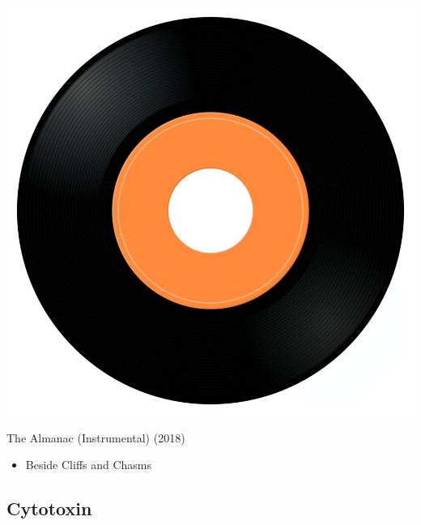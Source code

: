\begin{minipage}[t]{0.25\textwidth}\vspace{0pt}
\captionsetup{type=figure}
\includegraphics[width=\textwidth]{Images/cover.png}
\caption*{The Almanac (Instrumental) (2018)}
\end{minipage}
\begin{minipage}[t]{0.25\textwidth}\vspace{0pt}
\begin{itemize}[nosep,leftmargin=1em,labelwidth=*,align=left]
	\setlength{\itemsep}{0pt}
	\item Beside Cliffs and Chasms 
\end{itemize}
\end{minipage}

\subsection{Cytotoxin}

